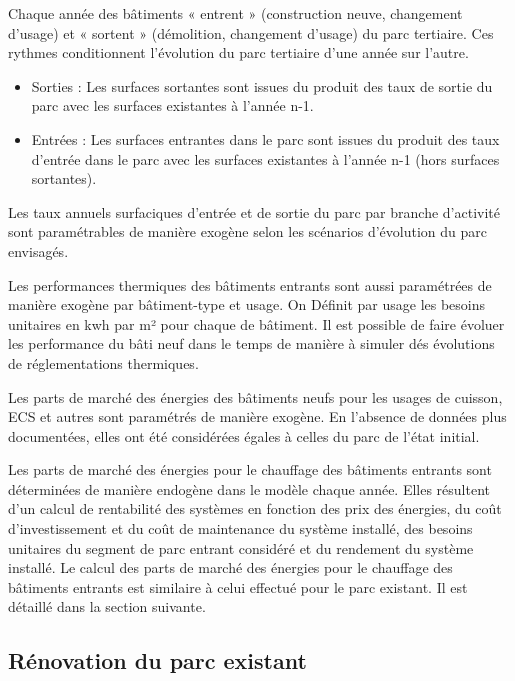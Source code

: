 \documentclass[10.5pt,a4paper]{article}
\begin{document}
{\begin{figure}[h!]
\end{figure}

Chaque année des bâtiments « entrent » (construction neuve, changement d’usage) et « sortent » (démolition, changement d’usage) du parc tertiaire. Ces rythmes conditionnent l’évolution du parc tertiaire d’une année sur l’autre.
\begin{itemize}

\item Sorties : Les surfaces sortantes sont issues du produit des taux de sortie du parc avec les surfaces existantes à l’année n-1. 
\item Entrées : Les surfaces entrantes dans le parc sont issues du produit des taux d’entrée dans le parc avec les surfaces existantes à l’année n-1 (hors surfaces sortantes). 
\end{itemize}


Les taux annuels surfaciques d’entrée et de sortie du parc par branche d'activité sont paramétrables de manière exogène selon les scénarios d'évolution du parc envisagés. 

Les performances thermiques des bâtiments entrants sont aussi paramétrées de manière exogène par bâtiment-type et usage. On Définit par usage les besoins unitaires en kwh par m² pour chaque de bâtiment. Il est possible de faire évoluer les performance du bâti neuf dans le temps de manière à simuler dés évolutions de réglementations thermiques.

Les parts de marché des énergies des bâtiments neufs pour les usages de cuisson, ECS et autres sont paramétrés de manière exogène. En l'absence de données plus documentées, elles ont été considérées égales à celles du parc de l’état initial. 
 
Les parts de marché des énergies pour le chauffage des bâtiments entrants sont déterminées de manière endogène dans le modèle chaque année. Elles résultent d’un calcul de rentabilité des systèmes en fonction des prix des énergies, du coût d’investissement et du coût de maintenance du système installé, des besoins unitaires du segment de parc entrant considéré et du rendement du système installé. Le calcul des parts de marché des énergies pour le chauffage des bâtiments entrants est similaire à celui effectué pour le parc existant. Il est détaillé dans la section suivante. 



\subsection{Rénovation du parc existant }

}
\end{document}
